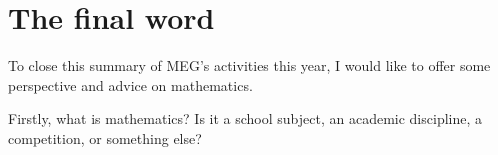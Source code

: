 \chapter*{The final word}
To close this summary of MEG's
activities this year, I would like
to offer some perspective and advice
on mathematics.

Firstly, what is mathematics?
Is it a school subject, an academic
discipline, a competition, or something
else?
